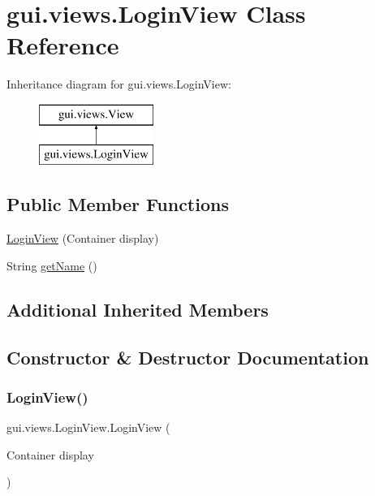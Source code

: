 \hypertarget{classgui_1_1views_1_1_login_view}{}\section{gui.\+views.\+Login\+View Class Reference}
\label{classgui_1_1views_1_1_login_view}
Inheritance diagram for gui.\+views.\+Login\+View\+:\begin{figure}[H]
\begin{center}
\leavevmode
\includegraphics[height=2.000000cm]{classgui_1_1views_1_1_login_view}
\end{center}
\end{figure}
\subsection*{Public Member Functions}
\begin{DoxyCompactItemize}
\item 
\mbox{\hyperlink{classgui_1_1views_1_1_login_view_a0dfea90f88e5a83dadc2a4e6574ef6f3}{Login\+View}} (Container display)
\item 
String \mbox{\hyperlink{classgui_1_1views_1_1_login_view_af4b196f0c4956bd079e4f6c14e575ff8}{get\+Name}} ()
\end{DoxyCompactItemize}
\subsection*{Additional Inherited Members}


\subsection{Constructor \& Destructor Documentation}
\mbox{\label{classgui_1_1views_1_1_login_view_a0dfea90f88e5a83dadc2a4e6574ef6f3}} 
\subsubsection{\texorpdfstring{Login\+View()}{LoginView()}}
{\footnotesize\ttfamily gui.\+views.\+Login\+View.\+Login\+View (\begin{DoxyParamCaption}\item[{Container}]{display }\end{DoxyParamCaption})\hspace{0.3cm}{\ttfamily [inline]}}

